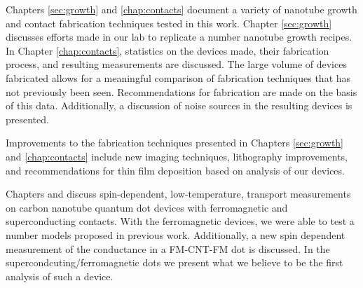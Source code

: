 Chapters \ref{sec:growth} and \ref{chap:contacts} document a variety of nanotube growth and contact fabrication techniques tested in this work. Chapter \ref{sec:growth} discusses  efforts made in our lab to replicate a number nanotube growth recipes. In Chapter \ref{chap:contacts}, statistics on the devices made, their fabrication process, and resulting measurements are discussed. The large volume of devices fabricated allows for a meaningful comparison of fabrication techniques that has not previously been seen. Recommendations for fabrication are made on the basis of this data. Additionally, a discussion of noise sources in the resulting devices is presented.

Improvements to the fabrication techniques presented in Chapters \ref{sec:growth} and \ref{chap:contacts} include new imaging techniques, lithography improvements, and recommendations for thin film deposition based on analysis of our devices.

Chapters \label{sec:FMCNTQD} and \label{sec:SCFM} discuss spin-dependent, low-temperature, transport measurements on carbon nanotube quantum dot devices with ferromagnetic and superconducting contacts. With the ferromagnetic devices, we were able to test a number models proposed in previous work. Additionally, a new spin dependent measurement of the conductance in a FM-CNT-FM dot is discussed. In the supercondcuting/ferromagnetic dots we present what we believe to be the first analysis of such a device.

